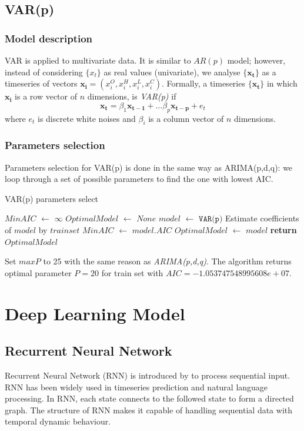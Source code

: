 \documentclass[11pt]{article}
\begin{document}
\subsection{VAR(p)}
\subsubsection{Model description}
VAR is applied to multivariate data. It is similar to $AR(p)$ model; however,
instead of considering $\{x_t\}$ as real values (univariate), we analyse
$\{\mathbf{x_t}\}$ as a timeseries of vectors $\mathbf{x_i}=(x_i^O, x_i^H, x_i^L, x_i^C)$. 
Formally, a timeseries $\{\mathbf{x_t}\}$ in which $\mathbf{x_i}$ is a row
vector of $n$ dimensions, is \textit{VAR(p)} if
$$
\mathbf{x_t}=\beta_1\mathbf{x_{t-1}} + \ldots \beta_p\mathbf{x_{t-p}} + e_t
$$
where $e_t$ is discrete white noises and $\beta_i$ is a column vector of $n$ dimensions.
\subsubsection{Parameters selection}
Parameters selection for VAR(p) is done in the same way as ARIMA(p,d,q): we loop
through a set of possible parameters to find the one with lowest AIC.
\begin{algorithm}[H]
\caption{VAR(p) parameters select}\label{paramsselect2}
\begin{algorithmic}[1]
  \State $MinAIC$ $\gets$ $\infty$
  \State $OptimalModel$ $\gets$ $None$
  \State $model$ $\gets$ $\texttt{VAR(p)}$
  \State Estimate coefficients of $model$ by $trainset$
  \State $MinAIC$ $\gets$ $model.AIC$
  \State $OptimalModel$ $\gets$ $model$
  \EndIf
  \EndFor
  \State \textbf{return} $OptimalModel$
\EndProcedure
\end{algorithmic}
\end{algorithm}
Set $maxP$ to 25 with the same reason as \textit{ARIMA(p,d,q)}. The algorithm
returns optimal parameter $P=20$ for train set with
$AIC=-1.053747548995608e+07$. 



\section{Deep Learning Model}
\subsection{Recurrent Neural Network}
Recurrent Neural Network (RNN) is introduced by \cite{rumelhart1988learning} to
process sequential input. RNN has been widely used in timeseries prediction and
natural language processing. In RNN, each state connects to the followed state
to form a directed graph. The structure of RNN makes it capable of handling
sequential data with temporal dynamic behaviour.
\end{document}
